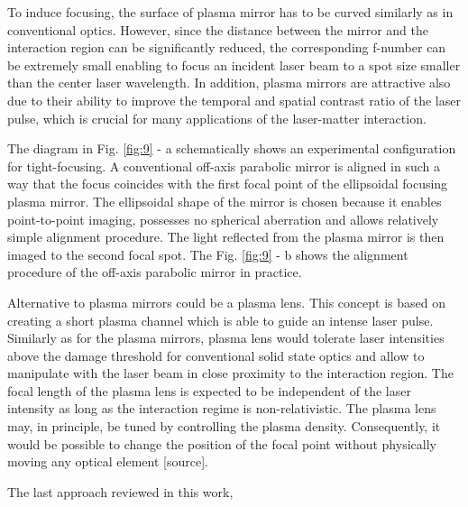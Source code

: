 To induce focusing, the surface of plasma mirror has to be curved similarly as in conventional optics. However, since the distance between the mirror and the interaction region can be significantly reduced, the corresponding f-number can be extremely small enabling to focus an incident laser beam to a spot size smaller than the center laser wavelength. In addition, plasma mirrors are attractive also due to their ability to improve the temporal and spatial contrast ratio of the laser pulse, which is crucial for many applications of the laser-matter interaction.

The diagram in Fig. \ref{fig:9} - a schematically shows an experimental configuration for tight-focusing. A conventional off-axis parabolic mirror is aligned in such a way that the focus coincides with the first focal point of the ellipsoidal focusing plasma mirror. The ellipsoidal shape of the mirror is chosen because it enables point-to-point imaging, possesses no spherical aberration and allows relatively simple alignment procedure. The light reflected from the plasma mirror is then imaged to the second focal spot. The Fig. \ref{fig:9} - b shows the alignment procedure of the off-axis parabolic mirror in practice.

Alternative to plasma mirrors could be a plasma lens. This concept is based on creating a short plasma channel which is able to guide an intense laser pulse. Similarly as for the plasma mirrors, plasma lens would tolerate laser intensities above the damage threshold for conventional solid state optics and allow to manipulate with the laser beam in close proximity to the interaction region. The focal length of the plasma lens is expected to be independent of the laser intensity as long as the interaction regime is non-relativistic. The plasma lens may, in principle, be tuned by controlling the plasma density. Consequently, it would be possible to change the position of the focal point without physically moving any optical element [source].

The last approach reviewed in this work,

